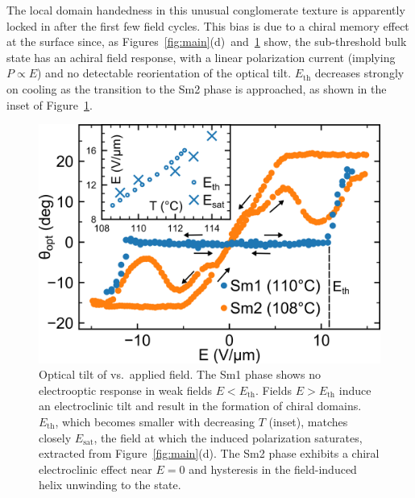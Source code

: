 \documentclass[aagreenthesis]{subfiles}
\begin{document}
The local domain handedness in this unusual conglomerate texture
is apparently locked in after the first few field cycles.  This bias is due to a chiral
memory effect at the surface since, as
Figures~\ref{fig:main}(d)~and~\ref{fig:threshold} show, the
sub-threshold bulk state has an achiral field response, with a linear polarization current (implying $P \propto E$) and no
detectable reorientation of the optical tilt.
$E_\text{th}$  decreases strongly on cooling as the transition to the Sm2 phase is approached, as shown in the inset of Figure~\ref{fig:threshold}.
%
\begin{figure}[h!]
    \centering
    \includegraphics[width=.6\textwidth]{figs/pal30/fromPaper/finalFigs/threshold-inset2.png}
    \caption{\label{fig:threshold}
        Optical tilt of  vs.\ applied field. The Sm1
        phase shows no electrooptic response in weak fields $E<E_\text{th}$. Fields $E>E_\text{th}$ induce an electroclinic
        tilt and result in the formation of chiral domains.
        $E_\text{th}$, which becomes smaller with decreasing $T$ (inset), matches
        closely $E_\text{sat}$, the field at which the induced
        polarization saturates, extracted from Figure~\ref{fig:main}(d).
        The Sm2 phase exhibits a chiral
        electroclinic effect near $E=0$ and hysteresis in the field-induced helix unwinding to the
         state.   }

\end{figure}
\end{document}
